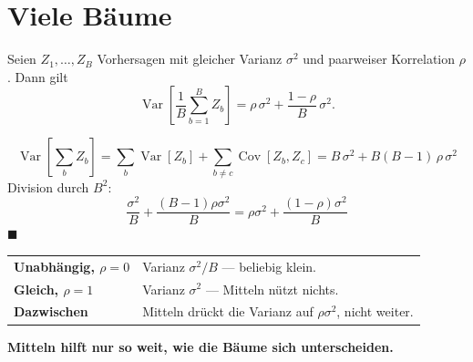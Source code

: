 \section{Viele Bäume}

\begin{merksatz}
Seien $Z_1,\ldots,Z_B$ Vorhersagen mit gleicher Varianz $\sigma^{2}$ und paarweiser Korrelation $\rho$. Dann gilt
\[ \operatorname{Var}\left[\frac1B\sum_{b=1}^{B}Z_b\right] = \rho\,\sigma^{2} + \frac{1-\rho}{B}\,\sigma^{2} . \]

\[ \operatorname{Var}\left[\sum_b Z_b\right] = \sum_b\operatorname{Var}[Z_b] + \sum_{b\ne c}\operatorname{Cov}[Z_b,Z_c] = B\,\sigma^{2} + B(B-1)\,\rho\,\sigma^{2} \]
Division durch $B^{2}$:
\[ \frac{\sigma^{2}}{B} + \frac{(B-1)\rho\sigma^{2}}{B} = \rho\sigma^{2} + \frac{(1-\rho)\sigma^{2}}{B} \]
$\blacksquare$

\begin{center}
{\small
\renewcommand{\arraystretch}{1.5}
\begin{tabular}{@{}P{2.4cm}P{6.2cm}@{}}
\toprule
\textbf{Unabhängig, $\rho = 0$} & Varianz $\sigma^{2}/B$ --- beliebig klein.\\
\textbf{Gleich, $\rho = 1$} & Varianz $\sigma^{2}$ --- Mitteln nützt nichts.\\
\textbf{Dazwischen} & Mitteln drückt die Varianz auf $\rho\sigma^{2}$, nicht weiter.\\
\bottomrule
\end{tabular}}
\end{center}

\begin{center}
\begin{minipage}{0.9\textwidth}
\textbf{Mitteln hilft nur so weit, wie die Bäume sich unterscheiden.}
\end{minipage}
\end{center}
\end{merksatz}

